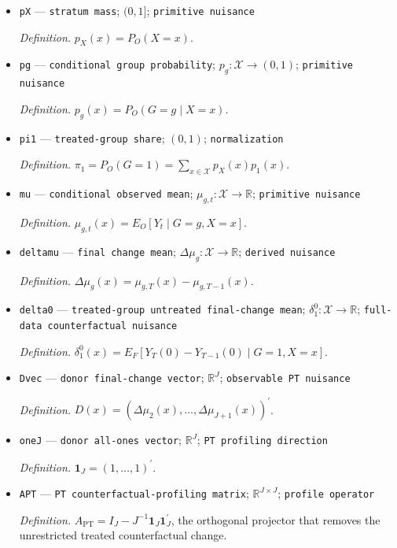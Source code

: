\documentclass{article}
\begin{document}
\begin{itemize}
  \item \texttt{pX} --- \texttt{stratum mass}; \((0,1]\); \texttt{primitive nuisance}
  \par\smallskip\noindent\emph{Definition.} \(p_X(x)=P_O(X=x)\).
  \item \texttt{pg} --- \texttt{conditional group probability}; \(p_g:\mathcal X\to(0,1)\); \texttt{primitive nuisance}
  \par\smallskip\noindent\emph{Definition.} \(p_g(x)=P_O(G=g\mid X=x)\).
  \item \texttt{pi1} --- \texttt{treated-\allowbreak{}group share}; \((0,1)\); \texttt{normalization}
  \par\smallskip\noindent\emph{Definition.} \(\pi_1=P_O(G=1)=\sum_{x\in\mathcal X}p_X(x)p_1(x)\).
  \item \texttt{mu} --- \texttt{conditional observed mean}; \(\mu_{g,t}:\mathcal X\to\mathbb R\); \texttt{primitive nuisance}
  \par\smallskip\noindent\emph{Definition.} \(\mu_{g,t}(x)=E_O[Y_t\mid G=g,X=x]\).
  \item \texttt{deltamu} --- \texttt{final change mean}; \(\Delta\mu_g:\mathcal X\to\mathbb R\); \texttt{derived nuisance}
  \par\smallskip\noindent\emph{Definition.} \(\Delta\mu_g(x)=\mu_{g,T}(x)-\mu_{g,T-1}(x)\).
  \item \texttt{delta0} --- \texttt{treated-\allowbreak{}group untreated final-\allowbreak{}change mean}; \(\delta_1^0:\mathcal X\to\mathbb R\); \texttt{full-\allowbreak{}data counterfactual nuisance}
  \par\smallskip\noindent\emph{Definition.} \(\delta_1^0(x)=E_F[Y_T(0)-Y_{T-1}(0)\mid G=1,X=x]\).
  \item \texttt{Dvec} --- \texttt{donor final-\allowbreak{}change vector}; \(\mathbb R^J\); \texttt{observable PT nuisance}
  \par\smallskip\noindent\emph{Definition.} \(D(x)=(\Delta\mu_2(x),\ldots,\Delta\mu_{J+1}(x))^{\prime}\).
  \item \texttt{oneJ} --- \texttt{donor all-\allowbreak{}ones vector}; \(\mathbb R^J\); \texttt{PT profiling direction}
  \par\smallskip\noindent\emph{Definition.} \(\mathbf 1_J=(1,\ldots,1)^{\prime}\).
  \item \texttt{APT} --- \texttt{PT counterfactual-\allowbreak{}profiling matrix}; \(\mathbb R^{J\times J}\); \texttt{profile operator}
  \par\smallskip\noindent\emph{Definition.} \(A_{\mathrm{PT}}=I_J-J^{-1}\mathbf 1_J\mathbf 1_J^{\prime}\), the orthogonal projector that removes the unrestricted treated counterfactual change.

\end{itemize}
\end{document}
